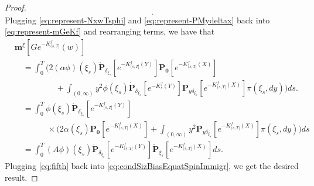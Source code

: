 \documentclass[UTF8]{pkuthss}
\theoremstyle{plain}
\theoremstyle{definition}
\numberwithin{equation}{section}
\begin{document}
\begin{proof}
\begin{equation}
	[e^{-K^f_{(s,T]}(X)}].
\end{equation}
	Plugging \eqref{eq:represent-NxwTsphi} and \eqref{eq:represent-PMydeltax} back into \eqref{eq:represent-mGeKf} and rearranging terms, we have that
\begin{align}\label{eq:fifth}
    &\mathbf m^\xi[Ge^{-K_{(s, T]}^f}(w)]\\
	&\quad=\int_0^T \Big(2(\alpha\phi)(\xi_s)\dot{\mathbf P}_{\delta_{\xi_s}}[e^{-K^f_{(s,T]}(Y)}]\mathbf P_{\mathbf 0}[e^{-K^f_{(s,T]}(X)}] \\
	&\qquad\qquad\quad + \int_{(0,\infty)}y^2\phi(\xi_s)\dot{\mathbf P}_{\delta_{\xi_s}}[e^{-K_s^f(Y)}]\mathbf P_{y\delta_{\xi_s}}[e^{-K^f_{(s,T]}(X)}]\pi(\xi_s,dy)\Big)ds.\\
	&\quad=\int_0^T \phi(\xi_s)\dot{\mathbf P}_{\delta_{\xi_s}}[e^{-K^f_{(s,T]}(Y)}] \\
	&\qquad\qquad\times\Big(2\alpha(\xi_s)\mathbf P_{\mathbf 0}[e^{-K^f_{(s,T]}(X)}] + \int_{(0,\infty)}y^2\mathbf P_{y\delta_{\xi_s}}[e^{-K^f_{(s,T]}(X)}]\pi(\xi_s,dy)\Big)ds\\
	&\quad =\int_0^T (A\phi)(\xi_s)\dot{\mathbf P}_{\delta_{\xi_s}}[e^{-K^f_{(s,T]}(Y)}]\widetilde {\mathbf P}_{\xi_s}[e^{-K^f_{(s,T]}(X)}]ds.
\end{align}
	Plugging \eqref{eq:fifth} back into \eqref{eq:condSizBiasEquatSpinImmigr}, we get the desired result.
\end{proof}
\end{document}
